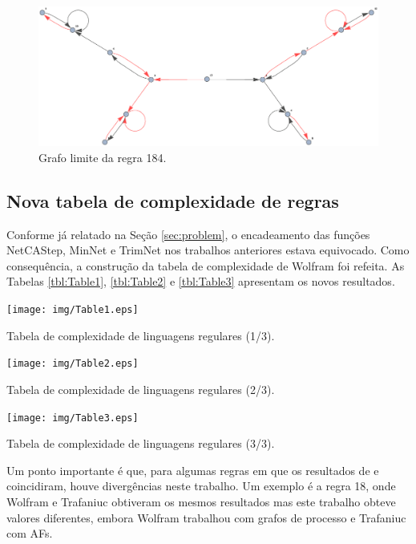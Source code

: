 \documentclass[12pt,a4paper]{article}
\begin{document}
\begin{figure}[htp]
\begin{center}
\includegraphics[scale=0.35]{img/limit184w.eps}
\caption{Grafo limite da regra 184.}
\label{fig:limit184w}
\end{center}
\end{figure}

\subsection{Nova tabela de complexidade de regras}

Conforme já relatado na Seção \ref{sec:problem}, o encadeamento das
funções NetCAStep, MinNet e TrimNet nos trabalhos anteriores estava
equivocado. Como consequência, a construção da tabela de complexidade
de Wolfram foi refeita. As Tabelas \ref{tbl:Table1}, \ref{tbl:Table2}
e \ref{tbl:Table3} apresentam os novos resultados.

\begin{table}
\centering
\texttt{[image: img/Table1.eps]}
\caption{Tabela de complexidade de linguagens regulares (1/3).}
\label{tbl:Table1}
\end{table}

\begin{table}
\centering
\texttt{[image: img/Table2.eps]}
\caption{Tabela de complexidade de linguagens regulares (2/3).}
\label{tbl:Table2}
\end{table}

\begin{table}
\centering
\texttt{[image: img/Table3.eps]}
\caption{Tabela de complexidade de linguagens regulares (3/3).}
\label{tbl:Table3}
\end{table}

Um ponto importante é que, para algumas regras em que os resultados de
 e  coincidiram, houve
divergências neste trabalho. Um exemplo é a regra 18, onde Wolfram e
Trafaniuc obtiveram os mesmos resultados mas este trabalho obteve valores
diferentes, embora Wolfram trabalhou com grafos de processo e Trafaniuc
com AFs.
\end{document}
